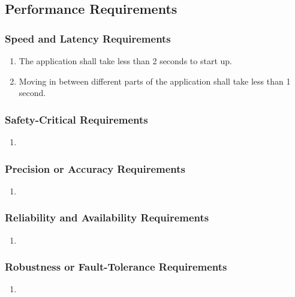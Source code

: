 \documentclass[]{article}
\begin{document}

\subsection{Performance Requirements}
\label{sub:performance_requirements}

\subsubsection{Speed and Latency Requirements}
\label{ssub:speed_and_latency_requirements}
\begin{enumerate}[{PR}1. ]
	\item The application shall take less than 2 seconds to start up.
	\item Moving in between different parts of the application shall take less than
1 second.
\end{enumerate}

\subsubsection{Safety-Critical Requirements}
\label{ssub:safety_critical_requirements}
\begin{enumerate}[{PR}1. ]
	\item
\end{enumerate}

\subsubsection{Precision or Accuracy Requirements}
\label{ssub:precision_or_accuracy_requirements}
\begin{enumerate}[{PR}1. ]
	\item
\end{enumerate}

\subsubsection{Reliability and Availability Requirements}
\label{ssub:reliability_and_availability_requirements}
\begin{enumerate}[{PR}1. ]
	\item
\end{enumerate}

\subsubsection{Robustness or Fault-Tolerance Requirements}
\label{ssub:robustness_or_fault_tolerance_requirements}
\begin{enumerate}[{PR}1. ]
	\item
\end{enumerate}
\end{document}
